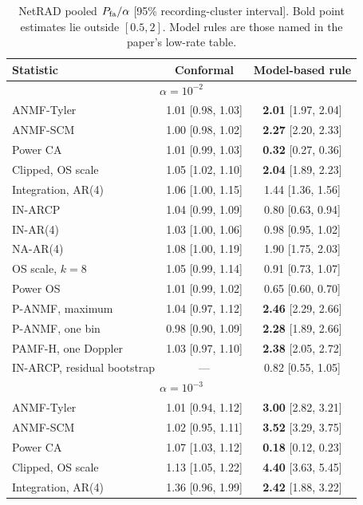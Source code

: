 \documentclass[10pt]{article}
\begin{document}
\begin{table}[htbp]
\centering\small
\caption{NetRAD pooled $P_{\rm fa}/\alpha$ [95\% recording-cluster interval]. Bold point estimates lie outside $[0.5,2]$. Model rules are those named in the paper's low-rate table.}\label{tab:netrad_ci}
\begin{tabular}{lcc}
\toprule
Statistic & Conformal & Model-based rule\\
\midrule\multicolumn{3}{c}{$\alpha=10^{-2}$}\\
ANMF-Tyler & 1.01 [0.98, 1.03] & \textbf{2.01} [1.97, 2.04] \\
ANMF-SCM & 1.00 [0.98, 1.02] & \textbf{2.27} [2.20, 2.33] \\
Power CA & 1.01 [0.99, 1.03] & \textbf{0.32} [0.27, 0.36] \\
Clipped, OS scale & 1.05 [1.02, 1.10] & \textbf{2.04} [1.89, 2.23] \\
Integration, AR(4) & 1.06 [1.00, 1.15] & 1.44 [1.36, 1.56] \\
IN-ARCP & 1.04 [0.99, 1.09] & 0.80 [0.63, 0.94] \\
IN-AR(4) & 1.03 [1.00, 1.06] & 0.98 [0.95, 1.02] \\
NA-AR(4) & 1.08 [1.00, 1.19] & 1.90 [1.75, 2.03] \\
OS scale, $k=8$ & 1.05 [0.99, 1.14] & 0.91 [0.73, 1.07] \\
Power OS & 1.01 [0.99, 1.02] & 0.65 [0.60, 0.70] \\
P-ANMF, maximum & 1.04 [0.97, 1.12] & \textbf{2.46} [2.29, 2.66] \\
P-ANMF, one bin & 0.98 [0.90, 1.09] & \textbf{2.28} [1.89, 2.66] \\
PAMF-H, one Doppler & 1.03 [0.97, 1.10] & \textbf{2.38} [2.05, 2.72] \\
IN-ARCP, residual bootstrap & --- & 0.82 [0.55, 1.05] \\
\midrule\multicolumn{3}{c}{$\alpha=10^{-3}$}\\
ANMF-Tyler & 1.01 [0.94, 1.12] & \textbf{3.00} [2.82, 3.21] \\
ANMF-SCM & 1.02 [0.95, 1.11] & \textbf{3.52} [3.29, 3.75] \\
Power CA & 1.07 [1.03, 1.12] & \textbf{0.18} [0.12, 0.23] \\
Clipped, OS scale & 1.13 [1.05, 1.22] & \textbf{4.40} [3.63, 5.45] \\
Integration, AR(4) & 1.36 [0.96, 1.99] & \textbf{2.42} [1.88, 3.22] \\

\end{tabular}
\end{table}
\end{document}
